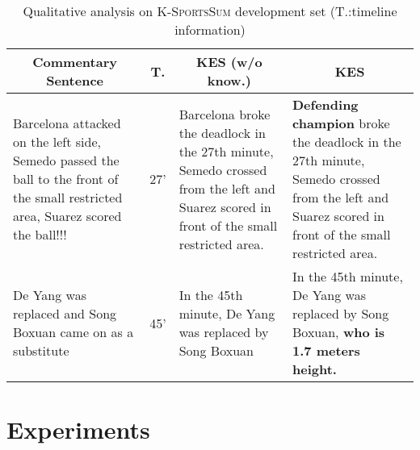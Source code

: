 \begin{table*}[t]
  \centering
    \begin{tabular}{p{}p{}p{}p{}}
    \hline
    \multicolumn{1}{c}{Commentary Sentence} & \multicolumn{1}{c}{T.} & \multicolumn{1}{c}{KES (w/o know.)} & \multicolumn{1}{c}{KES} \\ \hline
    Barcelona attacked on the left side, Semedo passed the ball to the front of the small restricted area, Suarez scored the ball!!! & \multicolumn{1}{c}{27'}      & Barcelona broke the deadlock in the 27th minute, Semedo crossed from the left and Suarez scored in front of the small restricted area. & \textbf{Defending champion} broke the deadlock in the 27th minute, Semedo crossed from the left and Suarez scored in front of the small restricted area. \\ \hline
    De Yang was replaced and Song Boxuan came on as a substitute                                                                     & \multicolumn{1}{c}{45'}      & In the 45th minute, De Yang was replaced by Song Boxuan                                                                                & In the 45th minute, De Yang was replaced by Song Boxuan, \textbf{who is 1.7 meters height.}                                                               \\ \hline
    \end{tabular}
  \caption{Qualitative analysis on \textsc{K-SportsSum} development set (T.:timeline information)}
  \label{table:case_study}
\end{table*}

\section{Experiments}


